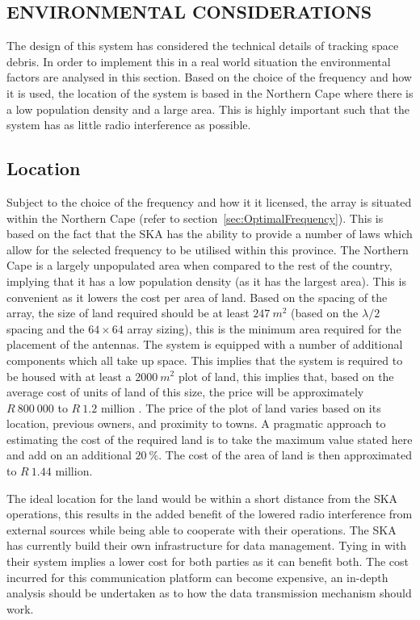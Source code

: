 \documentclass[11pt]{witseiepaper}
\begin{document}
\begin{bibunit}[witseie]
\section{ENVIRONMENTAL CONSIDERATIONS} \label{sec:EnvironmentalConsiderations}
The design of this system has considered the technical details of tracking space debris. In order to implement this in a real world situation the environmental factors are analysed in this section.
Based on the choice of the frequency and how it is used, the location of the system is based in the Northern Cape where there is a low population density and a large area. This is highly important such that the system has as little radio interference as possible.

\subsection{Location} \label{sec:Location}
Subject to the choice of the frequency and how it it licensed, the array is situated within the Northern Cape (refer to section~\ref{sec:OptimalFrequency}). This is based on the fact that the SKA has the ability to provide a number of laws which allow for the selected frequency to be utilised within this province.
The Northern Cape is a largely unpopulated area when compared to the rest of the country, implying that it has a low population density (as it has the largest area). This is convenient as it lowers the cost per area of land. 
Based on the spacing of the array, the size of land required should be at least $247~m^2$ (based on the $\lambda/2$ spacing and the $64 \times 64$ array sizing), this is the minimum area required for the placement of the antennas. The system is equipped with a number of additional components which all take up space.
This implies that the system is required to be housed with at least a $2000~m^2$ plot of land, this implies that, based on the average cost of units of land of this size, the price will be approximately $R~800~000$ to $R~1.2$ million \cite{LocationPrice1, LocationPrice2, LocationPrice3}.
The price of the plot of land varies based on its location, previous owners, and proximity to towns. A pragmatic approach to estimating the cost of the required land is to take the maximum value stated here and add on an additional $20~\%$. The cost of the area of land is then approximated to $R~1.44$ million.

The ideal location for the land would be within a short distance from the SKA operations, this results in the added benefit of the lowered radio interference from external sources while being able to cooperate with their operations. 
The SKA has currently build their own infrastructure for data management. Tying in with their system implies a lower cost for both parties as it can benefit both. The cost incurred for this communication platform can become expensive, an in-depth analysis should be undertaken as to how the data transmission mechanism should work.


\end{bibunit}
\end{document}
